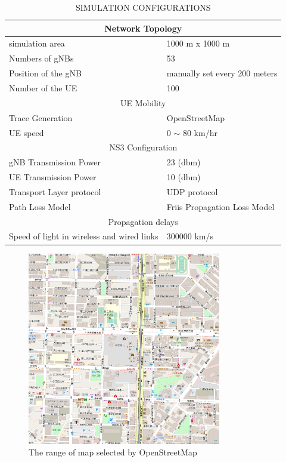 \documentclass[journal,10pt]{IEEEtran}
\begin{document}
\begin{table}[t!]
\caption{SIMULATION CONFIGURATIONS}
\label{tab:setting}
\centering
\begin{tabular}{ |p{4cm}|p{4cm}|  }
 \hline
 \multicolumn{2}{|c|}{Network Topology} \\
 \hline
 simulation area & 1000 m x 1000 m \\
 \hline
 Numbers of gNBs & 53 \\
 \hline
 Position of the gNB & manually set every 200 meters \\
 \hline
 Number of the UE & 100 \\
 \hline
 \multicolumn{2}{|c|}{UE Mobility} \\
 \hline
 Trace Generation & OpenStreetMap \\
 \hline
 UE speed & 0 $\sim$ 80 km/hr \\
 \hline
 \multicolumn{2}{|c|}{NS3 Configuration} \\
 \hline
 gNB Transmission Power & 23 (dbm) \cite{5GNR} \\
 \hline
 UE Transmission Power & 10 (dbm) \\
 \hline
 Transport Layer protocol & UDP protocol \\
 \hline
 Path Loss Model & Friis Propagation Loss Model \\
 \hline
 \multicolumn{2}{|c|}{Propagation delays} \\
 \hline
 Speed of light in wireless and wired links & 300000 km/s \\
 \hline
\end{tabular}
\end{table}

\begin{figure}[h]
    \centering
    \includegraphics[width=240pt]{picture/7.png}
    \caption{The range of map selected by OpenStreetMap}
    \label{fig:OpenStreetMap}
\end{figure}
\end{document}
